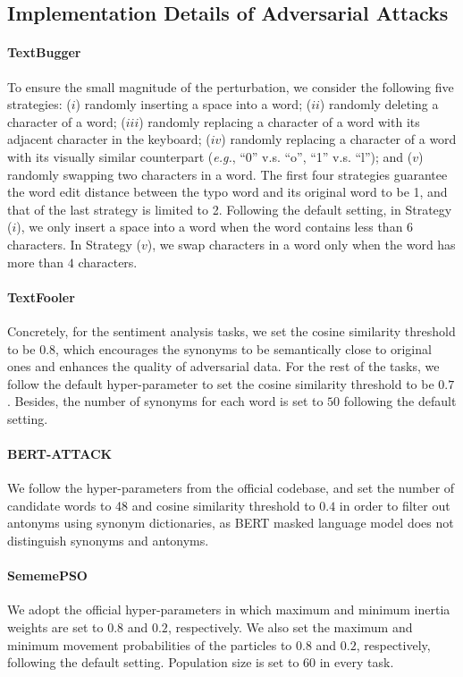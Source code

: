 \documentclass{article}
\begin{document}
\subsection{Implementation Details of Adversarial Attacks}
\label{appendix:imple}

\paragraph{TextBugger} 
To ensure the small magnitude of the perturbation, we consider the following five strategies: ($i$) randomly inserting a space into a word; ($ii$) randomly deleting a character of a word; ($iii$) randomly replacing a character of a word with its adjacent character in the keyboard; ($iv$) randomly replacing a character of a word with its visually similar counterpart (\emph{e.g.}, ``0'' v.s. ``o'', ``1'' v.s. ``l''); and ($v$) randomly swapping two characters in a word. The first four strategies guarantee the word edit distance between the typo word and its original word to be 1, and that of the last strategy is limited to 2. Following the default setting, in Strategy ($i$), we only insert a space into a word when the word contains less than $6$ characters. In Strategy ($v$), we swap characters in a word only when the word has more than $4$ characters.

\paragraph{TextFooler}  Concretely, for the sentiment analysis tasks, we set the cosine similarity threshold to be $0.8$, which encourages the synonyms to be semantically close to original ones and enhances the quality of adversarial data. For the rest of the tasks, we follow the default hyper-parameter to set the cosine similarity threshold to be $0.7$. Besides, the number of synonyms for each word is set to $50$ following the default setting.

\paragraph{BERT-ATTACK} We follow the hyper-parameters from the official codebase, and set the number of candidate words to 48 and cosine similarity threshold to $0.4$ in order to filter out antonyms using synonym dictionaries, as BERT masked language model does not distinguish synonyms and antonyms. 

\paragraph{SememePSO} We adopt the official hyper-parameters in which maximum and minimum inertia weights are set to $0.8$ and $0.2$, respectively. We also set the maximum and minimum movement probabilities of the particles to $0.8$ and $0.2$, respectively, following the default setting. Population size is set to $60$ in every task.
\end{document}
